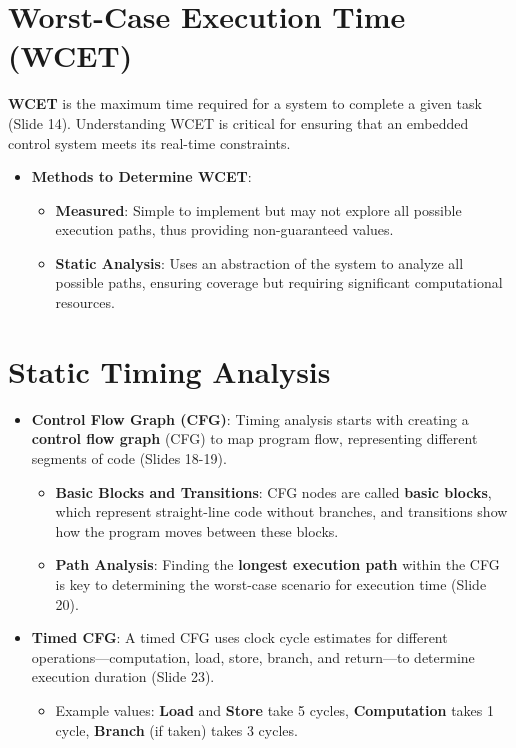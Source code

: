 \documentclass[
  14pt,
  a4paper,
  numbers=noendperiod,
  headinclude=true,
  footinclude=true,
  DIV=calc]{scrreprt}
\providecommand{\tightlist}{%
  \setlength{\itemsep}{0pt}\setlength{\parskip}{0pt}}\usepackage{longtable,booktabs,array}
\begin{document}
\section{Worst-Case Execution Time
(WCET)}\label{worst-case-execution-time-wcet}

\textbf{WCET} is the maximum time required for a system to complete a
given task (Slide 14). Understanding WCET is critical for ensuring that
an embedded control system meets its real-time constraints.

\begin{itemize}
\item
  \textbf{Methods to Determine WCET}:

  \begin{itemize}
  \item
    \textbf{Measured}: Simple to implement but may not explore all
    possible execution paths, thus providing non-guaranteed values.
  \item
    \textbf{Static Analysis}: Uses an abstraction of the system to
    analyze all possible paths, ensuring coverage but requiring
    significant computational resources.
  \end{itemize}
\end{itemize}

\section{Static Timing Analysis}\label{static-timing-analysis}

\begin{itemize}
\item
  \textbf{Control Flow Graph (CFG)}: Timing analysis starts with
  creating a \textbf{control flow graph} (CFG) to map program flow,
  representing different segments of code (Slides 18-19).

  \begin{itemize}
  \item
    \textbf{Basic Blocks and Transitions}: CFG nodes are called
    \textbf{basic blocks}, which represent straight-line code without
    branches, and transitions show how the program moves between these
    blocks.
  \item
    \textbf{Path Analysis}: Finding the \textbf{longest execution path}
    within the CFG is key to determining the worst-case scenario for
    execution time (Slide 20).
  \end{itemize}
\item
  \textbf{Timed CFG}: A timed CFG uses clock cycle estimates for
  different operations---computation, load, store, branch, and
  return---to determine execution duration (Slide 23).

  \begin{itemize}
  \tightlist
  \item
    Example values: \textbf{Load} and \textbf{Store} take 5 cycles,
    \textbf{Computation} takes 1 cycle, \textbf{Branch} (if taken) takes
    3 cycles.
  \end{itemize}
\end{itemize}
\end{document}
